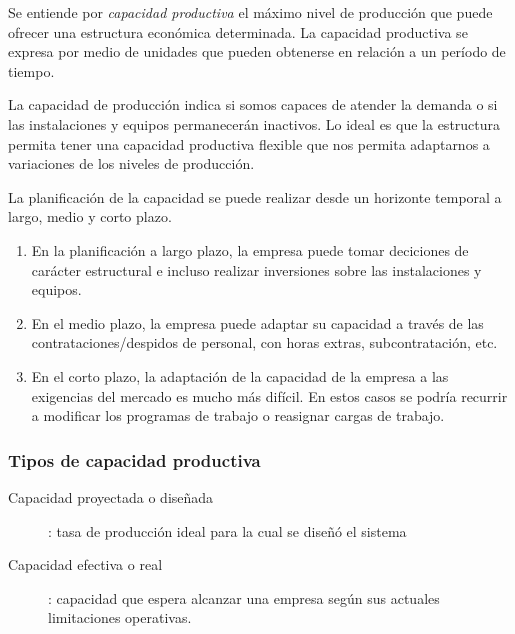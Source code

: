 \documentclass[10pt,a4paper,spanish]{report}
\begin{document}
                  Se entiende por \textit{\textcolor[rgb]{0.9,0.7,0.6}{capacidad productiva}} el máximo nivel de producción que puede ofrecer una estructura económica determinada. La capacidad productiva se expresa por medio de unidades que pueden obtenerse en relación a un período de tiempo.

                  La capacidad de producción indica si somos capaces de atender la demanda o si las instalaciones y equipos permanecerán inactivos. Lo ideal es que la estructura permita tener una capacidad productiva flexible que nos permita adaptarnos a variaciones de los niveles de producción.

                  La planificación de la capacidad se puede realizar desde un horizonte temporal a largo, medio y corto plazo.
                  \begin{enumerate}[---]
                        \item En la planificación a largo plazo, la empresa puede tomar deciciones de carácter estructural e incluso realizar inversiones sobre las instalaciones y equipos. 
                        \item En el medio plazo, la empresa puede adaptar su capacidad a través de las contrataciones/despidos de personal, con horas extras, subcontratación, etc.
                        \item En el corto plazo, la adaptación de la capacidad de la empresa a las exigencias del mercado es mucho más difícil. En estos casos se podría recurrir a modificar los programas de trabajo o reasignar cargas de trabajo.
                  \end{enumerate}

                  \subsubsection{\textcolor[rgb]{0.9,0.7,0.6}Tipos de capacidad productiva}

                        \begin{description}
                              \item[Capacidad proyectada o diseñada]: tasa de producción ideal para la cual se diseñó el sistema
                              \item[Capacidad efectiva o real]: capacidad que espera alcanzar una empresa según sus actuales limitaciones operativas.
                        \end{description}
\end{document}
